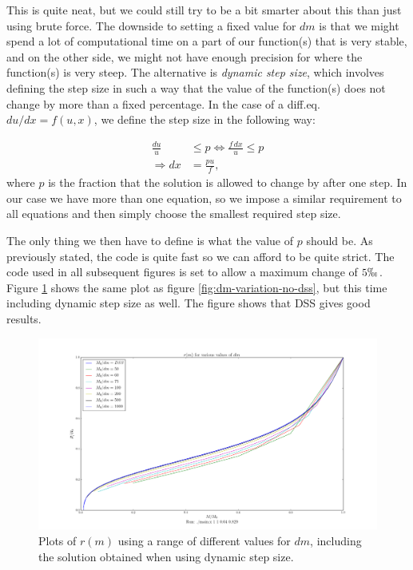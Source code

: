 \documentclass[11pt,twocolumn]{article}
\begin{document}
This is quite neat, but we could still try to be a bit smarter about
this than just using brute force. The downside to setting a fixed value for $dm$ is that we might spend
a lot of computational time on a part of our function(s) that is very
stable, and on the other side, we might not have enough precision for
where the function(s) is very steep. The alternative is \emph{dynamic
  step size}, which involves defining the step size in such a way
that the value of the function(s) does not change by more than a fixed
percentage. In the case of a diff.eq. $du/dx = f(u,x)$, we define the
step size in the following way:

\begin{align}
  \frac{du}{u} &\leq p\Leftrightarrow \frac{f\,dx}{u} \leq p\\
  \Rightarrow dx &= \frac{pu}{f},
\end{align}
where $p$ is the fraction that the solution is allowed to change by
after one step. In our case we have more than one equation, so we
impose a similar requirement to all equations and then simply choose
the smallest required step size.

The only thing we then have to define is what the value of $p$ should
be. As previously stated, the code is quite fast so we can afford to
be quite strict. The code used in all subsequent figures is set to
allow a maximum change of $5 \permil$. Figure \ref{fig:dm_variation}
shows the same plot as figure \ref{fig:dm-variation-no-dss}, but this
time including dynamic step size as well. The figure shows that DSS
gives good results. 

\begin{figure}[ht]
  \centering
  \includegraphics[width=\linewidth]{fig/dm_variation.png}
  \caption{\label{fig:dm_variation} Plots of $r(m)$ using a range of
    different values for $dm$, including the solution obtained when
    using dynamic step size.}
\end{figure}
\end{document}

